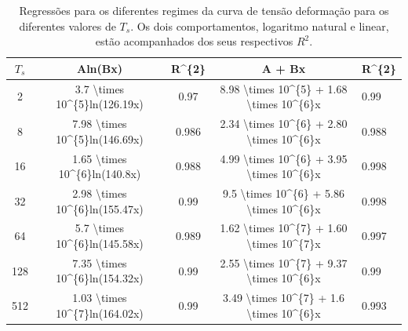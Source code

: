 \documentclass{article}
\begin{document}
    \begin{table}[H]
        \begin{tabular}{ccccl}
        \caption{Regressões para os diferentes regimes da curva de tensão deformação para os diferentes valores de \(T_{s}\).
        Os dois comportamentos, logaritmo natural e linear, estão acompanhados dos seus respectivos \(R^{2}\).}
        \hline
        \textbf{$T_{s}$} & \textbf{Aln(Bx)}                                                & \textbf{R\textasciicircum{}\{2\}} & \textbf{A + Bx}                                                                                              & R\textasciicircum{}\{2\} \\ \hline
        2                & 3.7 \textbackslash{}times 10\textasciicircum{}\{5\}ln(126.19x)  & 0.97                              & 8.98 \textbackslash{}times 10\textasciicircum{}\{5\} + 1.68 \textbackslash{}times 10\textasciicircum{}\{6\}x & 0.99                     \\
        8                & 7.98 \textbackslash{}times 10\textasciicircum{}\{5\}ln(146.69x) & 0.986                             & 2.34 \textbackslash{}times 10\textasciicircum{}\{6\} + 2.80 \textbackslash{}times 10\textasciicircum{}\{6\}x & 0.988                    \\
        16               & 1.65 \textbackslash{}times 10\textasciicircum{}\{6\}ln(140.8x)  & 0.988                             & 4.99 \textbackslash{}times 10\textasciicircum{}\{6\} + 3.95 \textbackslash{}times 10\textasciicircum{}\{6\}x & 0.998                    \\
        32               & 2.98 \textbackslash{}times 10\textasciicircum{}\{6\}ln(155.47x) & 0.99                              & 9.5 \textbackslash{}times 10\textasciicircum{}\{6\} + 5.86 \textbackslash{}times 10\textasciicircum{}\{6\}x  & 0.998                    \\
        64               & 5.7 \textbackslash{}times 10\textasciicircum{}\{6\}ln(145.58x)  & 0.989                             & 1.62 \textbackslash{}times 10\textasciicircum{}\{7\} + 1.60 \textbackslash{}times 10\textasciicircum{}\{7\}x & 0.997                    \\
        128              & 7.35 \textbackslash{}times 10\textasciicircum{}\{6\}ln(154.32x) & 0.99                              & 2.55 \textbackslash{}times 10\textasciicircum{}\{7\} + 9.37 \textbackslash{}times 10\textasciicircum{}\{6\}x & 0.99                     \\
        512              & 1.03 \textbackslash{}times 10\textasciicircum{}\{7\}ln(164.02x) & 0.99                              & 3.49 \textbackslash{}times 10\textasciicircum{}\{7\} + 1.6 \textbackslash{}times 10\textasciicircum{}\{6\}x  & 0.993                    \\

\end{tabular}
\end{table}
\end{document}
